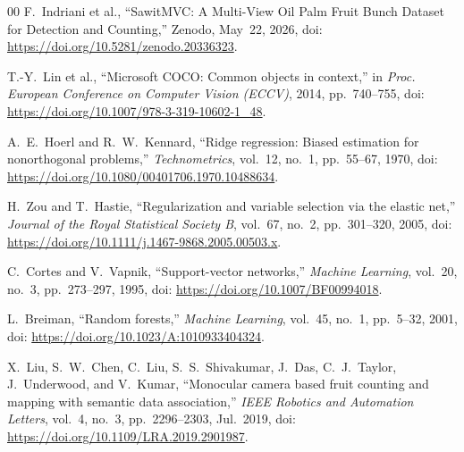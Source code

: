 ﻿\documentclass[conference]{IEEEtran}
\begin{document}
\begin{thebibliography}{00}
F.~Indriani et al.,
``SawitMVC: A Multi-View Oil Palm Fruit Bunch Dataset for Detection and
Counting,'' Zenodo, May~22, 2026,
doi: \url{https://doi.org/10.5281/zenodo.20336323}.

T.-Y.~Lin et al.,
``Microsoft COCO: Common objects in context,''
in \textit{Proc. European Conference on Computer Vision (ECCV)}, 2014,
pp.~740--755, doi: \url{https://doi.org/10.1007/978-3-319-10602-1_48}.

A.~E.~Hoerl and R.~W.~Kennard,
``Ridge regression: Biased estimation for nonorthogonal problems,''
\textit{Technometrics}, vol.~12, no.~1, pp.~55--67, 1970,
doi: \url{https://doi.org/10.1080/00401706.1970.10488634}.

H.~Zou and T.~Hastie,
``Regularization and variable selection via the elastic net,''
\textit{Journal of the Royal Statistical Society B}, vol.~67, no.~2,
pp.~301--320, 2005, doi: \url{https://doi.org/10.1111/j.1467-9868.2005.00503.x}.

C.~Cortes and V.~Vapnik,
``Support-vector networks,''
\textit{Machine Learning}, vol.~20, no.~3, pp.~273--297, 1995,
doi: \url{https://doi.org/10.1007/BF00994018}.

L.~Breiman,
``Random forests,''
\textit{Machine Learning}, vol.~45, no.~1, pp.~5--32, 2001,
doi: \url{https://doi.org/10.1023/A:1010933404324}.

X.~Liu, S.~W.~Chen, C.~Liu, S.~S.~Shivakumar, J.~Das, C.~J.~Taylor,
J.~Underwood, and V.~Kumar,
``Monocular camera based fruit counting and mapping with semantic data
association,''
\textit{IEEE Robotics and Automation Letters}, vol.~4, no.~3, pp.~2296--2303,
Jul.~2019, doi: \url{https://doi.org/10.1109/LRA.2019.2901987}.

\end{thebibliography}
\end{document}
